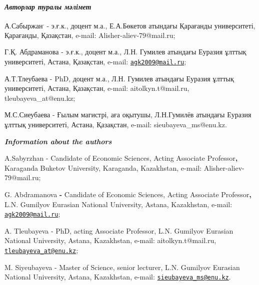 \begin{authorinfo}
\hspace{1em}\emph{{\bfseries Авторлар туралы мәлімет}}

А.Сабыржан\textsuperscript{.} - э.ғ.к., доцент м.а., Е.А.Бөкетов
атындағы Қарағанды университеті, Қарағанды, Қазақстан, e-mail:
Alisher-aliev-79@mail.ru;

Г.Қ. Абдраманова - э.ғ.к., доцент м.а., Л.Н. Гумилев атындағы Еуразия
ұлттық университеті, Астана, Қазақстан, e-mail:
\href{mailto:agk2009@mail.ru}{\nolinkurl{agk2009@mail.ru}};

А.Т.Тлеубаева - PhD, доцент м.а., Л.Н. Гумилев атындағы Еуразия ұлттық
университеті, Астана, Қазақстан, e-mail: aitolkyn.t@mail.ru,
tleubayeva\_at@enu.kz;

М.С.Сиеубаева - Ғылым магистрі, аға оқытушы, Л.Н.Гумилёв атындағы
Еуразия ұлттық университеті, Астана, Қазақстан, e-mail:
sieubayeva\_ms@enu.kz.

\hspace{1em}\emph{{\bfseries Information about the authors}}

A.Sabyrzhan - Candidate of Economic Sciences, Acting Associate
Professor{\bfseries ,} Karaganda Buketov University, Karaganda, Kazakhstan,
e-mail: Alisher-aliev-79@mail.ru;

G. Abdramanova {\bfseries -} Candidate of Economic Sciences, Acting
Associate Professor{\bfseries ,} L.N. Gumilyov Eurasian National
University, Astana, Kazakhstan, e-mail:
\href{mailto:agk2009@mail.ru}{\nolinkurl{agk2009@mail.ru}};

A. Tleubayeva - PhD, acting Associate Professor, L.N. Gumilyov Eurasian
National University, Astana, Kazakhstan, e-mail: aitolkyn.t@mail.ru,
\href{mailto:tleubayeva_at@enu.kz}{\nolinkurl{tleubayeva\_at@enu.kz}};

M. Siyeubayeva - Master of Science, senior lecturer, L.N. Gumilyov
Eurasian National University, Astana, Kazakhstan, e-mail:
\href{mailto:sieubayeva_ms@enu.kz}{\nolinkurl{sieubayeva\_ms@enu.kz}}.
\end{authorinfo}
